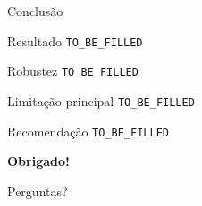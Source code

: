 
\begin{frame}{Conclusão}

    \begin{block}{Resultado}
        \texttt{TO\_BE\_FILLED}
    \end{block}

    \begin{block}{Robustez}
        \texttt{TO\_BE\_FILLED}
    \end{block}

    \begin{block}{Limitação principal}
        \texttt{TO\_BE\_FILLED}
    \end{block}

    \begin{block}{Recomendação}
        \texttt{TO\_BE\_FILLED}
    \end{block}

\end{frame}



\begin{frame}[plain]

    \begin{center}

        \vfill

        {\LARGE\bfseries Obrigado!}

        \vspace{0.8cm}

        {\large Perguntas?}

        \vfill

    \end{center}

\end{frame}


%
%
%
%


